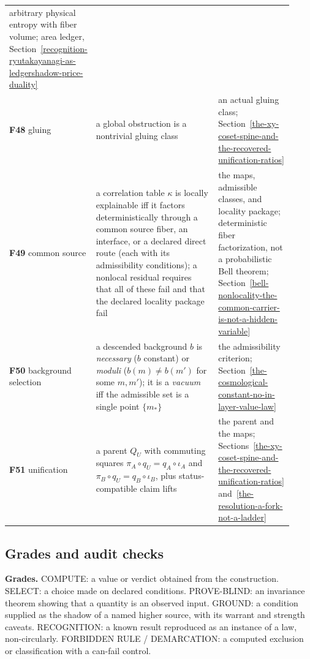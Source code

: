 \begin{center}
\begin{longtable}[]{@{}p{0.16\linewidth}p{0.48\linewidth}p{0.28\linewidth}@{}}
arbitrary physical entropy with fiber volume; area ledger, Section~\ref{recognition-ryutakayanagi-as-ledgershadow-price-duality}\\
\textbf{F48} gluing & a global obstruction is a nontrivial gluing class & an actual gluing class;
Section~\ref{the-xy-coset-spine-and-the-recovered-unification-ratios}\\
\textbf{F49} common source & a correlation table \(\kappa\) is locally explainable iff it factors deterministically
through a common source fiber, an interface, or a declared direct route (each with its admissibility conditions); a
nonlocal residual requires that all of these fail and that the declared locality package fail & the maps, admissible
classes, and locality package; deterministic fiber factorization, not a probabilistic Bell theorem; Section~\ref{bell-nonlocality-the-common-carrier-is-not-a-hidden-variable}\\
\textbf{F50} background selection & a descended background \(b\) is \emph{necessary} (\(b\) constant) or \emph{moduli}
(\(b(m)\neq b(m')\) for some \(m,m'\)); it is a \emph{vacuum} iff the admissible set is a single point \(\{m_*\}\) & the
admissibility criterion; Section~\ref{the-cosmological-constant-no-in-layer-value-law}\\
\textbf{F51} unification & a parent \(Q_U\) with commuting squares \(\pi_A\circ q_U = q_A\circ\iota_A\) and
\(\pi_B\circ q_U = q_B\circ\iota_B\), plus status-compatible claim lifts & the parent and the maps; Sections~\ref{the-xy-coset-spine-and-the-recovered-unification-ratios}
and~\ref{the-resolution-a-fork-not-a-ladder}\\
\bottomrule
\end{longtable}
\end{center}

\subsection{Grades and audit checks}\label{landing-modes-and-audit-gates-operational-definitions}

\textbf{Grades.} COMPUTE: a value or verdict obtained from the construction. SELECT: a choice made on declared
conditions. PROVE-BLIND: an invariance theorem showing that a quantity is an observed input. GROUND: a condition
supplied as the shadow of a named higher source, with its warrant and strength caveats. RECOGNITION: a known result
reproduced as an instance of a law, non-circularly. FORBIDDEN RULE / DEMARCATION: a computed exclusion or
classification with a can-fail control.

